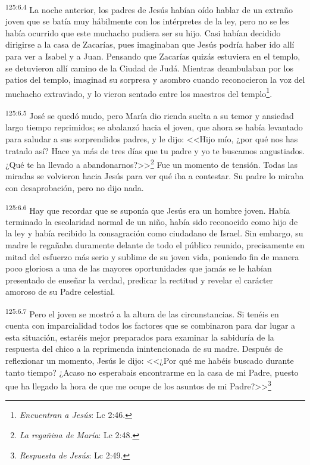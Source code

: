 \par 
\textsuperscript{125:6.4} La noche anterior, los padres de Jesús habían oído hablar de un extraño joven que se batía muy hábilmente con los intérpretes de la ley, pero no se les había ocurrido que este muchacho pudiera ser su hijo. Casi habían decidido dirigirse a la casa de Zacarías, pues imaginaban que Jesús podría haber ido allí para ver a Isabel y a Juan. Pensando que Zacarías quizás estuviera en el templo, se detuvieron allí camino de la Ciudad de Judá. Mientras deambulaban por los patios del templo, imaginad su sorpresa y asombro cuando reconocieron la voz del muchacho extraviado, y lo vieron sentado entre los maestros del templo\footnote{\textit{Encuentran a Jesús}: Lc 2:46.}.

\par 
\textsuperscript{125:6.5} José se quedó mudo, pero María dio rienda suelta a su temor y ansiedad largo tiempo reprimidos; se abalanzó hacia el joven, que ahora se había levantado para saludar a sus sorprendidos padres, y le dijo: <<Hijo mío, ¿por qué nos has tratado así? Hace ya más de tres días que tu padre y yo te buscamos angustiados. ¿Qué te ha llevado a abandonarnos?>>\footnote{\textit{La regañina de María}: Lc 2:48.} Fue un momento de tensión. Todas las miradas se volvieron hacia Jesús para ver qué iba a contestar. Su padre lo miraba con desaprobación, pero no dijo nada.

\par 
\textsuperscript{125:6.6} Hay que recordar que se suponía que Jesús era un hombre joven. Había terminado la escolaridad normal de un niño, había sido reconocido como hijo de la ley y había recibido la consagración como ciudadano de Israel. Sin embargo, su madre le regañaba duramente delante de todo el público reunido, precisamente en mitad del esfuerzo más serio y sublime de su joven vida, poniendo fin de manera poco gloriosa a una de las mayores oportunidades que jamás se le habían presentado de enseñar la verdad, predicar la rectitud y revelar el carácter amoroso de su Padre celestial.

\par 
\textsuperscript{125:6.7} Pero el joven se mostró a la altura de las circunstancias. Si tenéis en cuenta con imparcialidad todos los factores que se combinaron para dar lugar a esta situación, estaréis mejor preparados para examinar la sabiduría de la respuesta del chico a la reprimenda inintencionada de su madre. Después de reflexionar un momento, Jesús le dijo: <<¿Por qué me habéis buscado durante tanto tiempo? ¿Acaso no esperabais encontrarme en la casa de mi Padre, puesto que ha llegado la hora de que me ocupe de los asuntos de mi Padre?>>\footnote{\textit{Respuesta de Jesús}: Lc 2:49.}

